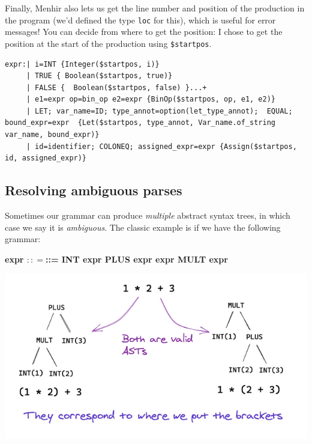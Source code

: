 Finally, Menhir also lets us get the line number and position of the
production in the program (we'd defined the type \texttt{loc} for this),
which is useful for error messages! You can decide from where to get the
position: I chose to get the position at the start of the production
using \texttt{\$startpos}.

%

\begin{lstlisting}
expr:| i=INT {Integer($startpos, i)}
     | TRUE { Boolean($startpos, true)}
     | FALSE {  Boolean($startpos, false) }...+
     | e1=expr op=bin_op e2=expr {BinOp($startpos, op, e1, e2)}
     | LET; var_name=ID; type_annot=option(let_type_annot);  EQUAL; bound_expr=expr  {Let($startpos, type_annot, Var_name.of_string var_name, bound_expr)}
     | id=identifier; COLONEQ; assigned_expr=expr {Assign($startpos, id, assigned_expr)}
\end{lstlisting}

\hypertarget{resolving-ambiguous-parses}{%
\subsection{\texorpdfstring{\protect\hyperlink{resolving-ambiguous-parses}{}Resolving
ambiguous
parses}{Resolving ambiguous parses}}\label{resolving-ambiguous-parses}}

Sometimes our grammar can produce \emph{multiple} abstract syntax trees,
in which case we say it is \emph{ambiguous}. The classic example is if
we have the following grammar:

\textbf{expr {{{\(:: =\)}{{{}{::=}}}}} \textbar{} INT \textbar{} expr
PLUS expr \textbar{} expr MULT expr}

{
\href{https://mukulrathi.com/static/23049100e53e9ffd7b0c6afc4e8a1bfd/bf8c1/ambig-parse.png}{{}
\includegraphics[width=\linewidth]{03_files/ambig-parse.png}} }

